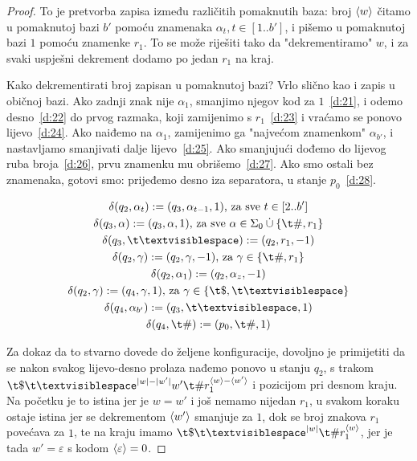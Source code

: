\begin{proof}
To je pretvorba zapisa između različitih pomaknutih baza: broj $\langle w\rangle$ čitamo u pomaknutoj bazi $b'$ pomoću znamenaka $\alpha_t,t\in[1..b']$, i pišemo u pomaknutoj bazi $1$ pomoću znamenke $r_1$. To se može riješiti tako da "dekrementiramo" $w$, i za svaki uspješni dekrement dodamo po jedan $r_1$ na kraj.

Kako dekrementirati broj zapisan u pomaknutoj bazi? Vrlo slično kao i zapis u običnoj bazi. Ako zadnji znak nije $\alpha_1$, smanjimo njegov kod za $1$~\eqref{d:21}, i odemo desno~\eqref{d:22} do prvog razmaka, koji zamijenimo s $r_1$~\eqref{d:23} i vraćamo se ponovo lijevo~\eqref{d:24}. Ako naiđemo na $\alpha_1$, zamijenimo ga "najvećom znamenkom" $\alpha_{b'}$, i nastavljamo smanjivati dalje lijevo~\eqref{d:25}. Ako smanjujući dođemo do lijevog ruba broja~\eqref{d:26}, prvu znamenku mu obrišemo~\eqref{d:27}. Ako smo ostali bez znamenaka, gotovi smo: prijeđemo desno iza separatora, u stanje $p_0$~\eqref{d:28}.

\noindent\begin{gather}
\label{d:21}\delta(q_2,\alpha_t):=(q_3,\alpha_{t-1},1)\text{, za sve }t\in[2..b']\\
\label{d:22}\delta(q_3,\alpha):=(q_3,\alpha,1)\text{, za sve }\alpha\in\Sigma_0\mathbin{\dot\cup}\{\t\#,r_1\}\\
\label{d:23}\delta(q_3,\bl):=(q_2,r_1,-1)\\
\label{d:24}\delta(q_2,\gamma):=(q_2,\gamma,-1)\text{, za }\gamma\in\{\t\#,r_1\}\\
\label{d:25}\delta(q_2,\alpha_1):=(q_2,\alpha_z,-1)\\
\label{d:26}\delta(q_2,\gamma):=(q_4,\gamma,1)\text{, za }\gamma\in\{\t\$,\bl\}\\
\label{d:27}\delta(q_4,\alpha_{b'}):=(q_3,\bl,1)\\
\label{d:28}\delta(q_4,\t\#):=(p_0,\t\#,1)
\end{gather}

Za dokaz da to stvarno dovede do željene konfiguracije, dovoljno je primijetiti da se nakon svakog lijevo-desno prolaza nađemo ponovo u stanju $q_2$, s trakom $\t\$\bl^{\dulj w-\dulj{w'}}w'\t\#r_1^{\kr w-\kr{w'}}$ i pozicijom pri desnom kraju. Na početku je to istina jer je $w=w'$ i još nemamo nijedan $r_1$, u svakom koraku ostaje istina jer se dekrementom $\langle w'\rangle$ smanjuje za $1$, dok se broj znakova $r_1$ povećava za $1$, te na kraju imamo $\t\$\bl^{\dulj w}\t\#r_1^{\kr w}$, jer je tada $w'=\varepsilon$ s kodom $\langle\varepsilon\rangle=0$.
\end{proof}


